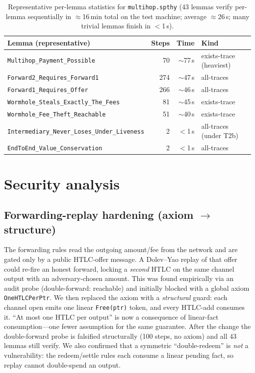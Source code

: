 \documentclass[11pt]{article}
\begin{document}
\begin{table}[h]
\centering
\small
\begin{tabular}{@{}lrrl@{}}
\toprule
\textbf{Lemma (representative)} & \textbf{Steps} & \textbf{Time} & \textbf{Kind} \\
\midrule
\texttt{Multihop_Payment_Possible}        & 70  & $\sim$77\,s & exists-trace (heaviest) \\
\texttt{Forward2_Requires_Forward1}        & 274 & $\sim$47\,s & all-traces \\
\texttt{Forward1_Requires_Offer}           & 266 & $\sim$46\,s & all-traces \\
\texttt{Wormhole_Steals_Exactly_The_Fees}  & 81  & $\sim$45\,s & exists-trace \\
\texttt{Wormhole_Fee_Theft_Reachable}      & 51  & $\sim$40\,s & exists-trace \\
\texttt{Intermediary_Never_Loses_Under_Liveness} & 2 & $<$1\,s & all-traces (under T2b) \\
\texttt{EndToEnd_Value_Conservation}       & 2   & $<$1\,s & all-traces \\
\bottomrule
\end{tabular}
\caption{Representative per-lemma statistics for \texttt{multihop.spthy}
(43 lemmas verify per-lemma sequentially in $\approx$16\,min total on the test
machine; average $\approx$26\,s; many trivial lemmas finish in $<$1\,s).}
\label{tab:stats}
\end{table}

\section{Security analysis}

\subsection{Forwarding-replay hardening (axiom $\to$ structure)}

The forwarding rules read the outgoing amount/fee from the network and are
gated only by a public HTLC-offer message. A Dolev--Yao replay of that offer
could re-fire an honest forward, locking a \emph{second} HTLC on the same
channel output with an adversary-chosen amount. This was found empirically via
an audit probe (double-forward: reachable) and initially blocked with a global
axiom \texttt{OneHTLCPerPtr}. We then replaced the axiom with a \emph{structural}
guard: each channel open emits one linear \texttt{Free(ptr)} token, and every
HTLC-add consumes it. ``At most one HTLC per output'' is now a consequence of
linear-fact consumption---one fewer assumption for the same guarantee. After
the change the double-forward probe is falsified structurally (100 steps, no
axiom) and all 43 lemmas still verify. We also confirmed that a symmetric
``double-redeem'' is \emph{not} a vulnerability: the redeem/settle rules each
consume a linear pending fact, so replay cannot double-spend an output.
\end{document}
